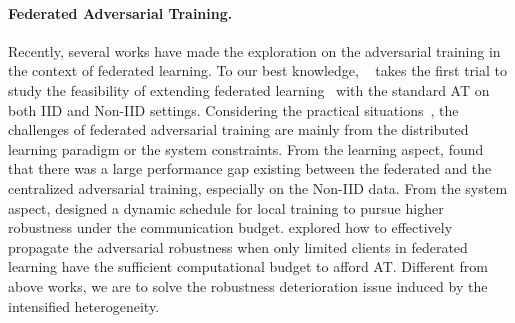 \documentclass{article} %
\theoremstyle{plain}
\theoremstyle{definition}
\theoremstyle{remark}
\begin{document}

\paragraph{Federated Adversarial Training.}
Recently, several works have made the exploration on the adversarial training in the context of federated learning. To our best knowledge, ~\citet{zizzo2020fat} takes the first trial to study the feasibility of extending federated learning~\citep{mcmahan2017communication} with the standard AT on both IID and Non-IID settings. Considering the practical situations~\citep{kairouz2019advances}, the challenges of federated adversarial training are mainly from the distributed learning paradigm or the system constraints. From the learning aspect, \citet{zizzo2020fat} found that there was a large performance gap existing between the federated and the centralized adversarial training, especially on the Non-IID data. From the system aspect,  \citet{shah2021adversarial} designed a dynamic schedule for local training to pursue higher robustness under the communication budget. \citet{hong2021federated} explored how to effectively propagate the adversarial robustness when only limited clients in federated learning have the sufficient computational budget to afford AT. 
Different from above works, we are to solve the robustness deterioration issue induced by the intensified heterogeneity.
\end{document}
